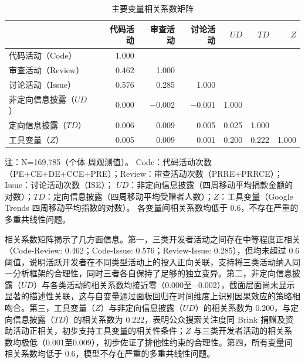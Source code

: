\begin{table}[htbp]
    \centering
    \caption{主要变量相关系数矩阵}
    \label{tab:correlation}
    \small
    \begin{tabularx}{\textwidth}{Xrrrrrr}
        \toprule
        & 代码活动 & 审查活动 & 讨论活动 & $UD$ & $TD$ & $Z$ \\
        \midrule
        代码活动（Code）     & 1.000 & & & & & \\
        审查活动（Review）   & 0.462 & 1.000 & & & & \\
        讨论活动（Issue）    & 0.576 & 0.285 & 1.000 & & & \\
        非定向信息披露（$UD$）  & 0.000 & $-$0.002 & $-$0.001 & 1.000 & & \\
        定向信息披露（$TD$）    & 0.006 & 0.009 & 0.005 & 0.025 & 1.000 & \\
        工具变量（$Z$）        & 0.005 & 0.009 & 0.001 & 0.200 & 0.222 & 1.000 \\
        \bottomrule
    \end{tabularx}
    \begin{minipage}{\textwidth}
        \vspace{0.3em}
        \footnotesize 注：N=169,785（个体-周观测值）。
        Code：代码活动次数（PE+CE+DE+CCE+PRE）；Review：审查活动次数（PRRE+PRRCE）；Issue：讨论活动次数（ISE）；
        $UD$：非定向信息披露（四周移动平均捐款金额的对数）；$TD$：定向信息披露（四周移动平均受赠者人数）；$Z$：工具变量（Google Trends 四周移动平均指数的对数）。
        各变量间相关系数均低于 0.6，不存在严重的多重共线性问题。
    \end{minipage}
\end{table}

相关系数矩阵揭示了几方面信息。第一，三类开发者活动之间存在中等程度正相关（Code-Review: 0.462；Code-Issue: 0.576；Review-Issue: 0.285），但均未超过 0.6 阈值，说明活跃开发者在不同类型活动上的投入正向关联，支持将三类活动纳入同一分析框架的合理性，同时三者各自保持了足够的独立变异。第二，非定向信息披露（$UD$）与各类活动的相关系数均接近零（0.000至$-$0.002），截面层面尚未显示显著的描述性关联，这与自变量通过面板回归在时间维度上识别因果效应的策略相吻合。第三，工具变量（$Z$）与非定向信息披露（$UD$）的相关系数为 0.200，与定向信息披露（$TD$）的相关系数为 0.222，表明公众搜索关注度同 Brink 捐赠及资助活动正相关，初步支持工具变量的相关性条件；$Z$ 与三类开发者活动的相关系数均极低（0.001至0.009），初步佐证了排他性约束的合理性。第四，所有变量间相关系数均低于 0.6，模型不存在严重的多重共线性问题。


